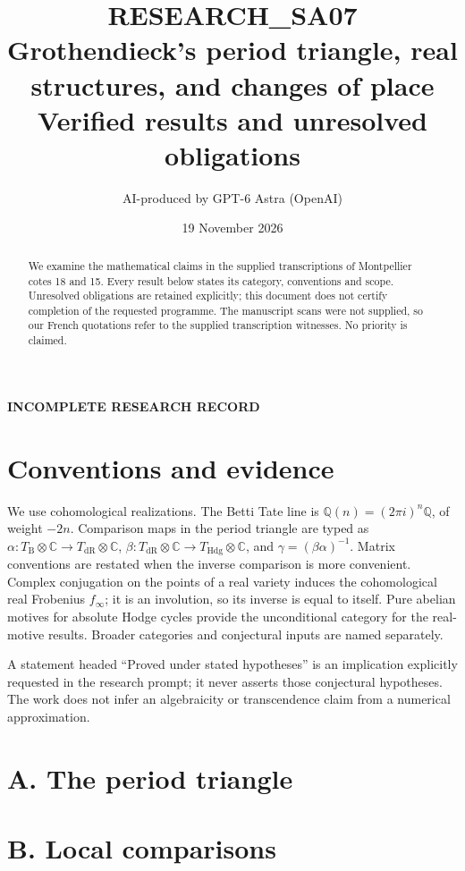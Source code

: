 \documentclass[11pt,a4paper]{article}
\title{RESEARCH\_SA07\\Grothendieck's period triangle, real structures, and changes of place\\\large Verified results and unresolved obligations}
\author{AI-produced by GPT-6 Astra (OpenAI)}
\date{19 November 2026}
\newcommand{\Q}{\mathbb Q}
\newcommand{\C}{\mathbb C}
\newcommand{\dR}{\mathrm{dR}}
\newcommand{\B}{\mathrm B}
\begin{document}
\maketitle
\begin{center}\textbf{INCOMPLETE RESEARCH RECORD}\end{center}
\begin{abstract}
We examine the mathematical claims in the supplied transcriptions of Montpellier cotes 18 and 15. Every result below states its category, conventions and scope. Unresolved obligations are retained explicitly; this document does not certify completion of the requested programme. The manuscript scans were not supplied, so our French quotations refer to the supplied transcription witnesses. No priority is claimed.
\end{abstract}
\tableofcontents
\section*{Conventions and evidence}
We use cohomological realizations. The Betti Tate line is $\Q(n)=(2\pi i)^n\Q$, of weight $-2n$. Comparison maps in the period triangle are typed as $\alpha:T_{\B}\otimes\C\to T_{\dR}\otimes\C$, $\beta:T_{\dR}\otimes\C\to T_{\mathrm{Hdg}}\otimes\C$, and $\gamma=(\beta\alpha)^{-1}$. Matrix conventions are restated when the inverse comparison is more convenient. Complex conjugation on the points of a real variety induces the cohomological real Frobenius $f_\infty$; it is an involution, so its inverse is equal to itself. Pure abelian motives for absolute Hodge cycles provide the unconditional category for the real-motive results. Broader categories and conjectural inputs are named separately.

A statement headed ``Proved under stated hypotheses'' is an implication explicitly requested in the research prompt; it never asserts those conjectural hypotheses. The work does not infer an algebraicity or transcendence claim from a numerical approximation.

\section{A. The period triangle}

\section{B. Local comparisons}
\end{document}
